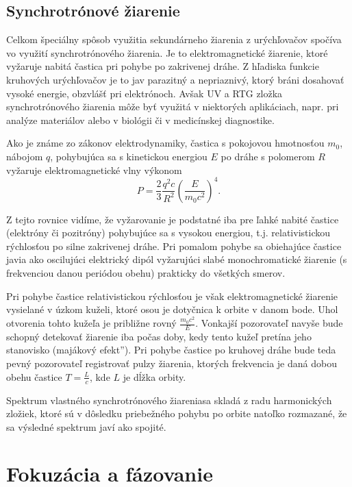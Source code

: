 \documentclass[../../main.tex]{subfiles}
\begin{document}
\subsection{Synchrotrónové žiarenie}

Celkom špeciálny spôsob využitia sekundárneho žiarenia z urýchľovačov spočíva vo využití synchrotrónového žiarenia. Je to elektromagnetické žiarenie, ktoré vyžaruje nabitá častica pri pohybe po zakrivenej dráhe. Z hľadiska funkcie kruhových urýchľovačov je to jav parazitný a nepriaznivý, ktorý bráni dosahovať vysoké energie, obzvlášť pri elektrónoch. Avšak UV a RTG zložka synchrotrónového žiarenia môže byť využitá v niektorých aplikáciach, napr. pri analýze materiálov alebo v biológii či v medicínskej diagnostike.

Ako je známe zo zákonov elektrodynamiky, častica s pokojovou hmotnosťou $m_0$, nábojom $q$, pohybujúca sa s kinetickou energiou $E$ po dráhe s polomerom $R$ vyžaruje elektromagnetické vlny výkonom
\begin{equation}
P=\dfrac{2}{3}\dfrac{q^2c}{R^2}\left(\dfrac{E}{m_0c^2}\right)^4.
\end{equation}

Z tejto rovnice vidíme, že vyžarovanie je podstatné iba pre ľahké nabité častice (elektróny či pozitróny) pohybujúce sa s vysokou energiou, t.j. relativistickou rýchlosťou po silne zakrivenej dráhe. Pri pomalom pohybe sa obiehajúce častice javia ako oscilujúci elektrický dipól vyžarujúci slabé monochromatické žiarenie (s frekvenciou danou periódou obehu) prakticky do všetkých smerov.

Pri pohybe častice relativistickou rýchlosťou je však elektromagnetické žiarenie vysielané v úzkom kuželi, ktoré osou je dotyčnica k orbite v danom bode. Uhol otvorenia tohto kužeľa je približne rovný $\frac{m_0c^2}{E}$. Vonkajší pozorovateľ navyše bude schopný detekovať žiarenie iba počas doby, kedy tento kužeľ pretína jeho stanovisko (\quotedblbase majákový efekt\textquotedblright ). Pri pohybe častice po kruhovej dráhe bude teda pevný pozorovateľ registrovať pulzy žiarenia, ktorých frekvencia je daná dobou obehu častice $T=\frac{L}{c}$, kde $L$ je dĺžka orbity.

Spektrum vlastného synchrotrónového žiareniasa skladá z radu harmonických zložiek, ktoré sú v dôsledku priebežného pohybu po orbite natoľko rozmazané, že sa výsledné spektrum javí ako spojité.

\section{Fokuzácia a fázovanie}
\end{document}
